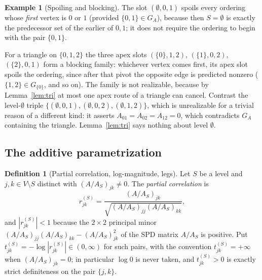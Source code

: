 \documentclass[11pt]{article}
\theoremstyle{plain}
\theoremstyle{definition}
\newtheorem{definition}[theorem]{Definition}
\newtheorem{example}[theorem]{Example}
\theoremstyle{remark}
\begin{document}
\begin{aiblock}
\begin{example}[Spoiling and blocking]\label{ex:spoils}
The slot $(\emptyset,0,1)$ spoils every ordering whose \emph{first} vertex is $0$ or $1$ (provided
$\{0,1\}\in G_A$), because then $S=\emptyset$ is exactly the predecessor set of the earlier of $0,1$;
it does not require the ordering to begin with the pair $\{0,1\}$.

For a triangle on $\{0,1,2\}$ the three apex slots $(\{0\},1,2)$, $(\{1\},0,2)$, $(\{2\},0,1)$ form a
blocking family: whichever vertex comes first, its apex slot spoils the ordering, since after that
pivot the opposite edge is predicted nonzero ($\{1,2\}\in G_{\{0\}}$, and so on). The family is not
realizable, because by Lemma~\ref{lem:tri} at most one apex route of a triangle can cancel. Contrast
the level-$\emptyset$ triple $\{(\emptyset,0,1),(\emptyset,0,2),(\emptyset,1,2)\}$, which is
unrealizable for a trivial reason of a different kind: it asserts $A_{01}=A_{02}=A_{12}=0$, which
contradicts $G_A$ containing the triangle. Lemma~\ref{lem:tri} says nothing about level $\emptyset$.
\end{example}

\subsection{The additive parametrization}

\begin{definition}[Partial correlation, log-magnitude, legs]\label{def:t}
Let $S$ be a level and $j,k\in V\setminus S$ distinct with $(A/A_S)_{jk}\neq0$. The \emph{partial
correlation} is
\[
r^{(S)}_{jk}=\frac{(A/A_S)_{jk}}{\sqrt{(A/A_S)_{jj}(A/A_S)_{kk}}},
\]
and $|r^{(S)}_{jk}|<1$ because the $2\times2$ principal minor
$(A/A_S)_{jj}(A/A_S)_{kk}-(A/A_S)_{jk}^2$ of the SPD matrix $A/A_S$ is positive. Put
$t^{(S)}_{jk}=-\log|r^{(S)}_{jk}|\in(0,\infty)$ for such pairs, with the convention
$t^{(S)}_{jk}=+\infty$ when $(A/A_S)_{jk}=0$; in particular $\log0$ is never taken, and
$t^{(S)}_{jk}>0$ is exactly strict definiteness on the pair $\{j,k\}$.
\end{definition}


\end{aiblock}
\end{document}
